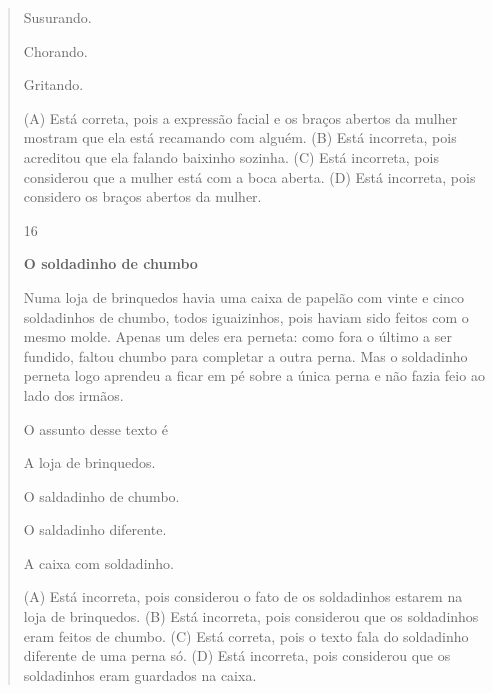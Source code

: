 \begin{verse}
\begin{minipage}{.5\textwidth}
\begin{escolha}
\item Susurando.

\item Chorando.

\item Gritando.
\end{escolha}
\end{minipage}

(A) Está correta, pois a expressão facial e os braços abertos da mulher mostram que ela está recamando com alguém.
(B) Está incorreta, pois acreditou que ela falando baixinho sozinha.
(C) Está incorreta, pois considerou que a mulher está com a boca aberta.
(D) Está incorreta, pois considero os braços abertos da mulher.

\num{16}

\textbf{O soldadinho de chumbo}

Numa loja de brinquedos havia uma caixa de papelão com
vinte e cinco soldadinhos de chumbo, todos iguaizinhos, pois
haviam sido feitos com o mesmo molde. Apenas um deles
era perneta: como fora o último a ser fundido, faltou chumbo
para completar a outra perna. Mas o soldadinho perneta logo
aprendeu a ficar em pé sobre a única perna e não fazia feio ao
lado dos irmãos.


O assunto desse texto é

\begin{escolha}
\item A loja de brinquedos.

\item O saldadinho de chumbo.

\item O saldadinho diferente.

\item A caixa com soldadinho.
\end{escolha}


(A) Está incorreta, pois considerou o fato de os soldadinhos estarem na loja de brinquedos.
(B) Está incorreta, pois considerou que os soldadinhos eram feitos de chumbo.
(C) Está correta, pois o texto fala do soldadinho diferente de uma perna só.
(D) Está incorreta, pois considerou que os soldadinhos eram guardados na caixa.


\end{verse}
